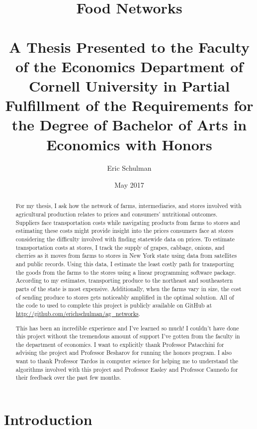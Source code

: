\documentclass{report}
\title{Food Networks \\~\\ \normalsize A Thesis Presented to the Faculty of the Economics Department of Cornell University in Partial Fulfillment of the Requirements for the Degree of Bachelor of Arts in Economics with Honors}
\author{Eric Schulman}
\date{May 2017}
\begin{document}
\maketitle

\pagebreak

\begin{abstract}
For my thesis, I ask how the network of farms, intermediaries, and stores involved with agricultural production relates to prices and consumers' nutritional outcomes. Suppliers face transportation costs while navigating products from farms to stores and estimating these costs might provide insight into the prices consumers face at stores considering the difficulty involved with finding statewide data on prices. To estimate transportation costs at stores, I track the supply of grapes, cabbage, onions, and cherries as it moves from farms to stores in New York state using data from satellites and public records. Using this data, I estimate the least costly path for transporting the goods from the farms to the stores using a linear programming software package. According to my estimates, transporting produce to the northeast and southeastern parts of the state is most expensive. Additionally, when the farms vary in size, the cost of sending produce to stores gets noticeably amplified in the optimal solution. All of the code to used to complete this project is publicly available on GitHub at \url{http://github.com/erichschulman/ag_networks}. 
\end{abstract}

\pagebreak

\renewcommand{\abstractname}{Acknowledgments}
\begin{abstract}
This has been an incredible experience and I've learned so much! I couldn't have done this project without the tremendous amount of support I've gotten from the faculty in the department of economics. I want to explicitly thank Professor Patacchini for advising the project and Professor Besharov for running the honors program. I also want to thank Professor Tardos in computer science for helping me to understand the algorithms involved with this project and Professor Easley and Professor Caunedo for their feedback over the past few months. 
\end{abstract}

\tableofcontents

\chapter{Introduction}
\end{document}
